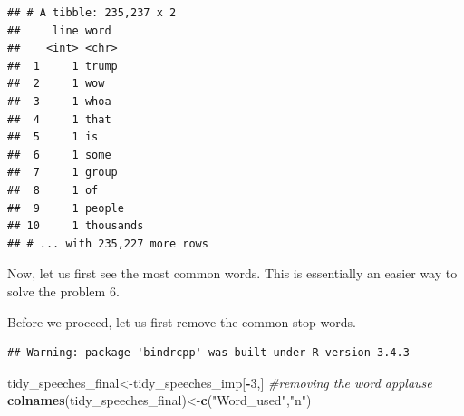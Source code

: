 \documentclass[]{article}
\newenvironment{Shaded}{\begin{snugshade}}{\end{snugshade}}
\newcommand{\KeywordTok}[1]{\textcolor[rgb]{0.13,0.29,0.53}{\textbf{#1}}}
\newcommand{\DataTypeTok}[1]{\textcolor[rgb]{0.13,0.29,0.53}{#1}}
\newcommand{\DecValTok}[1]{\textcolor[rgb]{0.00,0.00,0.81}{#1}}
\newcommand{\StringTok}[1]{\textcolor[rgb]{0.31,0.60,0.02}{#1}}
\newcommand{\CommentTok}[1]{\textcolor[rgb]{0.56,0.35,0.01}{\textit{#1}}}
\newcommand{\OtherTok}[1]{\textcolor[rgb]{0.56,0.35,0.01}{#1}}
\newcommand{\OperatorTok}[1]{\textcolor[rgb]{0.81,0.36,0.00}{\textbf{#1}}}
\newcommand{\NormalTok}[1]{#1}
\begin{document}
\begin{Shaded}
\end{Shaded}

\begin{verbatim}
## # A tibble: 235,237 x 2
##     line word     
##    <int> <chr>    
##  1     1 trump    
##  2     1 wow      
##  3     1 whoa     
##  4     1 that     
##  5     1 is       
##  6     1 some     
##  7     1 group    
##  8     1 of       
##  9     1 people   
## 10     1 thousands
## # ... with 235,227 more rows
\end{verbatim}

Now, let us first see the most common words. This is essentially an
easier way to solve the problem 6.

Before we proceed, let us first remove the common stop words.

\begin{Shaded}
\end{Shaded}

\begin{verbatim}
## Warning: package 'bindrcpp' was built under R version 3.4.3
\end{verbatim}

\begin{Shaded}
\begin{Highlighting}[]
\NormalTok{tidy_speeches_final<-tidy_speeches_imp[}\OperatorTok{-}\DecValTok{3}\NormalTok{,] }\CommentTok{#removing the word applause}
\KeywordTok{colnames}\NormalTok{(tidy_speeches_final)<-}\KeywordTok{c}\NormalTok{(}\StringTok{"Word_used"}\NormalTok{,}\StringTok{"n"}\NormalTok{)}
\end{Highlighting}
\end{Shaded}
\end{document}
